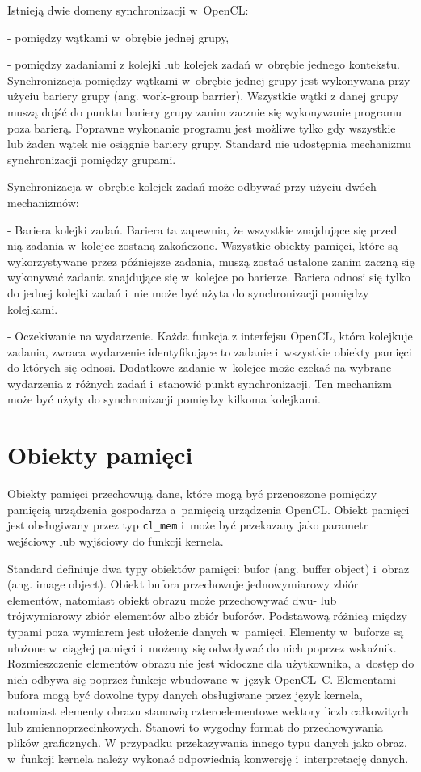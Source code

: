 Istnieją dwie domeny synchronizacji w~OpenCL:

- pomiędzy wątkami w~obrębie jednej grupy,

- pomiędzy zadaniami z kolejki lub kolejek zadań w~obrębie jednego kontekstu.\\

Synchronizacja pomiędzy wątkami w~obrębie jednej grupy jest wykonywana przy użyciu bariery grupy (ang. work-group barrier). Wszystkie wątki z danej grupy muszą dojść do punktu bariery grupy zanim zacznie się wykonywanie programu poza barierą. Poprawne wykonanie programu jest możliwe tylko gdy wszystkie lub żaden wątek nie osiągnie bariery grupy. Standard nie udostępnia mechanizmu synchronizacji pomiędzy grupami.

Synchronizacja w~obrębie kolejek zadań może odbywać przy użyciu dwóch mechanizmów:

- Bariera kolejki zadań. Bariera ta zapewnia, że wszystkie znajdujące się przed nią zadania w~kolejce zostaną zakończone. Wszystkie obiekty pamięci, które są wykorzystywane przez późniejsze zadania, muszą zostać ustalone zanim zaczną się wykonywać zadania znajdujące się w~kolejce po barierze. Bariera odnosi się tylko do jednej kolejki zadań i~nie może być użyta do synchronizacji pomiędzy kolejkami. 

- Oczekiwanie na wydarzenie. Każda funkcja z interfejsu OpenCL, która kolejkuje zadania, zwraca wydarzenie identyfikujące to zadanie i~wszystkie obiekty pamięci do których się odnosi. Dodatkowe zadanie w~kolejce może czekać na wybrane wydarzenia z różnych zadań i~stanowić punkt synchronizacji. Ten mechanizm może być użyty do synchronizacji pomiędzy kilkoma kolejkami.

\section{Obiekty pamięci}\label{sec:OpenC61asdL}

Obiekty pamięci przechowują dane, które mogą być przenoszone pomiędzy pamięcią urządzenia gospodarza a~pamięcią urządzenia OpenCL. Obiekt pamięci jest obsługiwany przez typ \verb|cl_mem| i~może być przekazany jako parametr wejściowy lub wyjściowy do funkcji kernela.

Standard definiuje dwa typy obiektów pamięci: bufor (ang. buffer object) i~obraz (ang. image object). Obiekt bufora przechowuje jednowymiarowy zbiór elementów, natomiast obiekt obrazu może przechowywać dwu- lub trójwymiarowy zbiór elementów albo zbiór buforów. Podstawową różnicą między typami poza wymiarem jest ułożenie danych w~pamięci. Elementy w~buforze są ułożone w~ciągłej pamięci i~możemy się odwoływać do nich poprzez wskaźnik. Rozmieszczenie elementów obrazu nie jest widoczne dla użytkownika, a~dostęp do nich odbywa się poprzez funkcje wbudowane w~język OpenCL~C. Elementami bufora mogą być dowolne typy danych obsługiwane przez język kernela, natomiast elementy obrazu stanowią czteroelementowe wektory liczb całkowitych lub zmiennoprzecinkowych. Stanowi to wygodny format do przechowywania plików graficznych. W przypadku przekazywania innego typu danych jako obraz, w~funkcji kernela należy wykonać odpowiednią konwersję i~interpretację danych.

